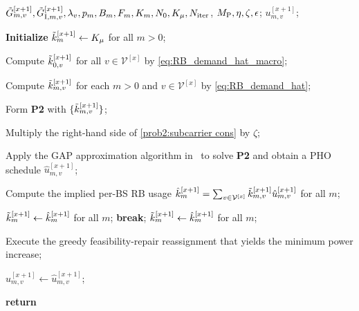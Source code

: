 \documentclass[conference, a4paper]{IEEEtran}
\theoremstyle{remark}
\begin{document}
\begin{algorithm}[htbp]
    \caption{Generalized Assignment-based Proactive Handover (GAP-HO)}
    \label{alg:GAP-HO}
    \renewcommand{\algorithmicrequire}{\textbf{Input:}}
    \renewcommand{\algorithmicensure}{\textbf{Output:}}
    \begin{algorithmic}[1]
        \REQUIRE
        $\Tilde{G}_{m,v}^{[x+1]}, \Tilde{G}_{{\rm I},m,v}^{[x+1]}, \lambda_v, p_m, B_m, F_m, K_m, N_0, K_\mu, N_{\rm iter}$, $M_{\rm P}, \eta, \zeta, \epsilon$;
        \ENSURE
        $u_{m,v}^{[x+1]}$;

        \STATE \textbf{Initialize} $\Tilde{k}_{m}^{[x+1]} \gets K_\mu$ for all $m>0$;

        \STATE Compute $\Tilde{k}_{0,v}^{[x+1]}$ for all $v \in \mathcal{V}^{[x]}$
        by \eqref{eq:RB_demand_hat_macro};

            \STATE Compute $\Tilde{k}_{m,v}^{[x+1]}$ for each $m>0$ and $v \in \mathcal{V}^{[x]}$ by \eqref{eq:RB_demand_hat};

            \STATE Form \textbf{P2} with $\{\Tilde{k}_{m,v}^{[x+1]}\}$;
            
                \STATE Multiply the right-hand side of \eqref{prob2:subcarrier cons} by $\zeta$;
            \ENDWHILE

            \STATE Apply the GAP approximation algorithm in~\cite{shmoys1993approximation}
                   to solve \textbf{P2} and obtain a PHO schedule
                   $\hat{u}_{m,v}^{[x+1]}$;

            \STATE Compute the implied per-BS RB usage
            $\hat{k}_{m}^{[x+1]} = \sum_{v \in \mathcal{V}^{[x]}}
                  \Tilde{k}_{m,v}^{[x+1]} \hat{u}_{m,v}^{[x+1]}$ for all $m$;

                \STATE $\Tilde{k}_{m}^{[x+1]} \gets \hat{k}_{m}^{[x+1]}$ for all $m$;
                \STATE \textbf{break};
            \ELSE
                \STATE $\Tilde{k}_{m}^{[x+1]} \gets \hat{k}_{m}^{[x+1]}$ for all $m$;
            \ENDIF
        \ENDFOR

        
            \STATE Execute the greedy feasibility-repair reassignment that yields the minimum power increase;
        \ENDWHILE

        \STATE $u_{m,v}^{[x+1]} \leftarrow \hat{u}_{m,v}^{[x+1]}$;

        \STATE \textbf{return}
    \end{algorithmic}
\end{algorithm}
\end{document}
